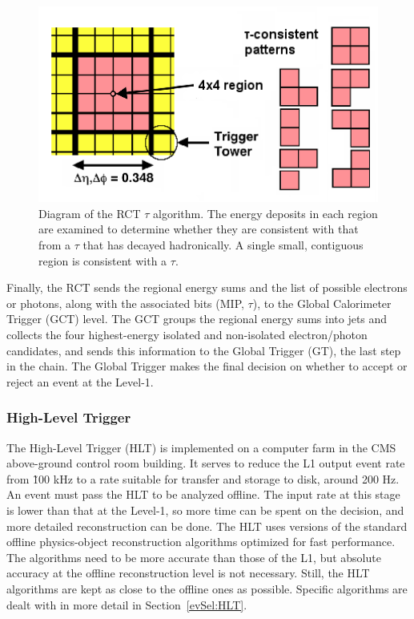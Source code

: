  \begin{figure}[htb]
  \begin{center}
    \includegraphics[width=400pt]{Figures/RCT-tau-algo.png} 
  \end{center}
  \caption[\fixspacing Diagram of the RCT $\tau$ algorithm]{
    \fixspacing Diagram of the RCT $\tau$ algorithm. 
    The energy deposits in each region are 
    examined to determine whether they are 
    consistent with that from a $\tau$ 
    that has decayed hadronically.  
    A single small, contiguous region 
    is consistent with a $\tau$. 
  }
  \label{fig:RctTauAlgo}
 \end{figure}

Finally, the RCT sends the regional energy sums 
and the list of possible 
electrons or photons, 
along with the associated bits (MIP, $\tau$), 
to the 
Global Calorimeter Trigger (GCT) level.  
The GCT groups the regional energy sums into jets 
and collects the four highest-energy isolated and 
non-isolated electron/photon candidates, 
and sends this information to the Global Trigger (GT), 
the last step in the chain.  
The Global Trigger makes the final decision on 
whether to accept or reject an event at the Level-1.  


\subsubsection{High-Level Trigger}
\label{exp:HLT}

The High-Level Trigger (HLT) \cite{hlt-0512077} 
is implemented on a computer farm in the 
CMS above-ground control room building.  
It serves to reduce the L1 output event rate from \~100 kHz to a rate suitable 
for transfer and storage to disk, around 200 Hz.  
An event must pass the HLT to be analyzed offline.  
The input rate at this stage is lower than that at the Level-1, 
so more time can be 
spent %
on the decision, 
and more detailed reconstruction can be done.  
The HLT uses versions of the standard offline physics-object reconstruction algorithms 
optimized for fast performance.  
The algorithms need to be more accurate than those of the L1, 
but absolute accuracy at the offline reconstruction level is not necessary.  
Still, the HLT algorithms are kept as close to the offline ones as possible.  
Specific algorithms are dealt with in more detail in 
Section~\ref{evSel:HLT}.  

